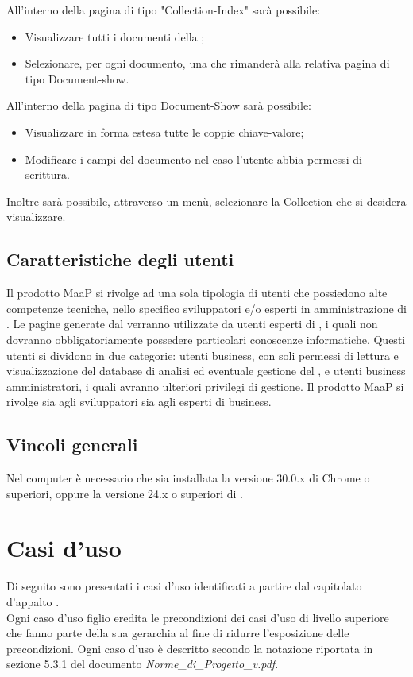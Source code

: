 All'interno della pagina di tipo "Collection-Index" sarà possibile:
\begin{itemize}
\item Visualizzare tutti i documenti della ;
\item Selezionare, per ogni documento, una  che rimanderà alla relativa pagina di tipo Document-show.
\end{itemize}

All'interno della pagina di tipo Document-Show sarà possibile:
\begin{itemize}
\item Visualizzare in forma estesa tutte le coppie chiave-valore;
\item Modificare i campi del documento nel caso l'utente abbia permessi di scrittura.
\end{itemize}

Inoltre sarà possibile, attraverso un menù, selezionare la Collection che si desidera visualizzare.

\subsection{Caratteristiche degli utenti}
Il prodotto MaaP si rivolge ad una sola tipologia di utenti che possiedono alte competenze tecniche, nello specifico sviluppatori e/o esperti in amministrazione di . Le pagine generate dal  verranno utilizzate da utenti esperti di , i quali non dovranno obbligatoriamente possedere particolari conoscenze informatiche. Questi utenti si dividono in due categorie: utenti business, con soli permessi di lettura e visualizzazione del database di analisi ed eventuale gestione del , e utenti business amministratori, i quali avranno ulteriori privilegi di gestione.
Il prodotto MaaP si rivolge sia agli sviluppatori sia agli esperti di business.

\subsection{Vincoli generali}
Nel computer è necessario che sia installata la versione 30.0.x di  Chrome o superiori, oppure la versione 24.x o superiori di .

\newpage
\section{Casi d'uso} %
Di seguito sono presentati i casi d'uso identificati a partire dal capitolato d'appalto \Progetto. \\
Ogni caso d'uso figlio eredita le precondizioni dei casi d'uso di livello superiore che fanno parte della sua gerarchia al fine di ridurre l'esposizione delle precondizioni.
Ogni caso d'uso è descritto secondo la notazione riportata in sezione 5.3.1 del documento \emph{Norme\_{}di\_{}Progetto\_{}v\versioneNormeDiProgetto{}.pdf}.


